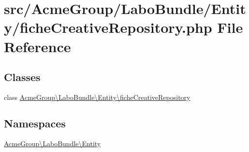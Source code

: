 \hypertarget{fiche_creative_repository_8php}{\section{src/\+Acme\+Group/\+Labo\+Bundle/\+Entity/fiche\+Creative\+Repository.php File Reference}
\label{fiche_creative_repository_8php}
}
\subsection*{Classes}
\begin{DoxyCompactItemize}
\item 
class \hyperlink{class_acme_group_1_1_labo_bundle_1_1_entity_1_1fiche_creative_repository}{Acme\+Group\textbackslash{}\+Labo\+Bundle\textbackslash{}\+Entity\textbackslash{}fiche\+Creative\+Repository}
\end{DoxyCompactItemize}
\subsection*{Namespaces}
\begin{DoxyCompactItemize}
\item 
 \hyperlink{namespace_acme_group_1_1_labo_bundle_1_1_entity}{Acme\+Group\textbackslash{}\+Labo\+Bundle\textbackslash{}\+Entity}
\end{DoxyCompactItemize}
